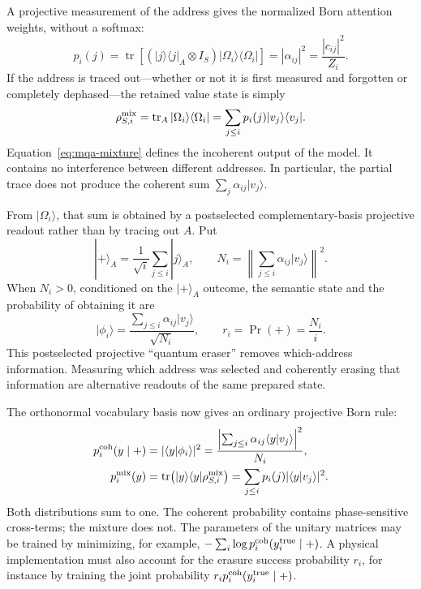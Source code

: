 \documentclass[
  aps,
  reprint,
  superscriptaddress,
  floatfix,
  nofootinbib,
  longbibliography
]{revtex4-2}
\begin{document}
A projective measurement of the address gives the normalized Born attention
weights, without a softmax:
\begin{equation}
 p_i(j)
 =\operatorname{tr}\!\left[
 (|j\rangle\langle j|_A\otimes I_S)
 |\Omega_i\rangle\langle\Omega_i|
 \right]
 =|\alpha_{ij}|^2
 =\frac{|c_{ij}|^2}{Z_i}.
\label{eq:mqa-address}
\end{equation}
If the address is traced out---whether or not it is first measured and
forgotten or completely dephased---the retained value state is simply
\begin{equation}
 \rho_{S,i}^{\rm mix}
 =\operatorname{tr}_A|\Omega_i\rangle\langle\Omega_i|
 =\sum_{j\leq i}p_i(j)|v_j\rangle\langle v_j|.
\label{eq:mqa-mixture}
\end{equation}
Equation~\eqref{eq:mqa-mixture} defines the incoherent output of the model.
It contains no interference between different addresses.  In
particular, the partial trace does not produce the coherent sum
$\sum_j\alpha_{ij}|v_j\rangle$.

From $|\Omega_i\rangle$, that sum is obtained by a postselected
complementary-basis projective readout rather than by tracing out $A$.  Put
\begin{equation}
 |+\rangle_A=\frac{1}{\sqrt{i}}\sum_{j\leq i}|j\rangle_A,\qquad
 N_i=\left\|\sum_{j\leq i}\alpha_{ij}|v_j\rangle\right\|^2 .
\label{eq:mqa-erasure}
\end{equation}
When $N_i>0$, conditioned on the $|+\rangle_A$ outcome, the semantic state and the
probability of obtaining it are
\begin{equation}
 |\phi_i\rangle
 =\frac{\sum_{j\leq i}\alpha_{ij}|v_j\rangle}{\sqrt{N_i}},
 \qquad
 r_i=\Pr(+)=\frac{N_i}{i}.
\label{eq:mqa-coherent}
\end{equation}
This postselected projective ``quantum eraser'' removes which-address information.
Measuring which address was selected and coherently erasing that information
are alternative readouts of the same prepared state.

The orthonormal vocabulary basis now gives an ordinary projective Born rule:
\begin{equation}
\begin{aligned}
 p_i^{\rm coh}(y\mid +)
 &=|\langle y|\phi_i\rangle|^2
 =\frac{\left|\sum_{j\leq i}
       \alpha_{ij}\langle y|v_j\rangle\right|^2}{N_i},\\
 p_i^{\rm mix}(y)
 &=\operatorname{tr}\!\left(
 |y\rangle\langle y|\rho_{S,i}^{\rm mix}\right)
 =\sum_{j\leq i}p_i(j)|\langle y|v_j\rangle|^2 .
\end{aligned}
\label{eq:mqa-vocabulary}
\end{equation}
Both distributions sum to one.  The coherent probability contains
phase-sensitive cross-terms; the mixture does not.  The parameters of the
unitary matrices may be trained by minimizing, for example,
$-\sum_i\log p_i^{\rm coh}(y_i^{\rm true}\mid +)$.  A physical implementation
must also account for the erasure success probability $r_i$, for instance by
training the joint probability $r_i p_i^{\rm coh}(y_i^{\rm true}\mid +)$.
\end{document}
